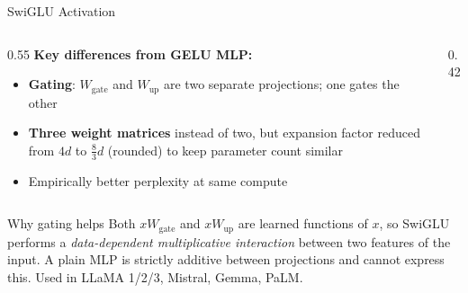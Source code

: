\begin{frame}{SwiGLU Activation~\cite{shazeer2020glu}}
  \vspace{0.3em}
  \begin{columns}[T]
    \begin{column}{0.55\textwidth}
      \textbf{Key differences from GELU MLP:}
      \begin{itemize}
        \item \textbf{Gating}: $W_{\text{gate}}$ and $W_{\text{up}}$ are two separate projections; one gates the other
        \item \textbf{Three weight matrices} instead of two, but expansion factor reduced from $4d$ to $\frac{8}{3}d$ (rounded) to keep parameter count similar
        \item Empirically better perplexity at same compute
      \end{itemize}
    \end{column}
    \begin{column}{0.42\textwidth}
    \end{column}
  \end{columns}

  \vspace{0.3em}
  \begin{block}{Why gating helps}
    Both $xW_{\text{gate}}$ and $xW_{\text{up}}$ are learned functions of $x$, so SwiGLU performs a \emph{data-dependent multiplicative interaction} between two features of the input. A plain MLP is strictly additive between projections and cannot express this. Used in LLaMA 1/2/3, Mistral, Gemma, PaLM.
  \end{block}
\end{frame}

